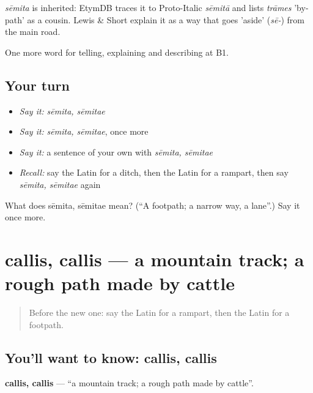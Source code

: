 \begin{cousinweb}
\emph{sēmita} is inherited: EtymDB traces it to Proto-Italic \emph{sēmitā} and lists \emph{trāmes} 'by-path' as a cousin. Lewis \& Short explain it as a way that goes 'aside' (\emph{sē-}) from the main road.
\end{cousinweb}

\begin{grammarlens}[title={What you've built}]
One more word for telling, explaining and describing at B1.
\end{grammarlens}

\subsection*{Your turn}
\begin{itemize}
\raggedright
  \item \emph{Say it:} \emph{sēmita, sēmitae}
  \item \emph{Say it:} \emph{sēmita, sēmitae}, once more
  \item \emph{Say it:} a sentence of your own with \emph{sēmita, sēmitae}
  \item \emph{Recall:} say the Latin for a ditch, then the Latin for a rampart, then say \emph{sēmita, sēmitae} again
\end{itemize}

\begin{tcolorbox}[breakable,colback=teal!4,colframe=teal!35!black,title={Before you move on}]
What does sēmita, sēmitae mean? (\textquotedblleft{}A footpath; a narrow way, a lane\textquotedblright{}.) Say it once more.
\end{tcolorbox}
\section[callis, callis]{callis, callis — a mountain track; a rough path made by cattle}

\label{lesson:LA-C423-callis}



\begin{quote}
Before the new one: say the Latin for a rampart, then the Latin for a footpath.
\end{quote}

\subsection*{You'll want to know: callis, callis}
\textbf{callis, callis} — \textquotedblleft{}a mountain track; a rough path made by cattle\textquotedblright{}.


